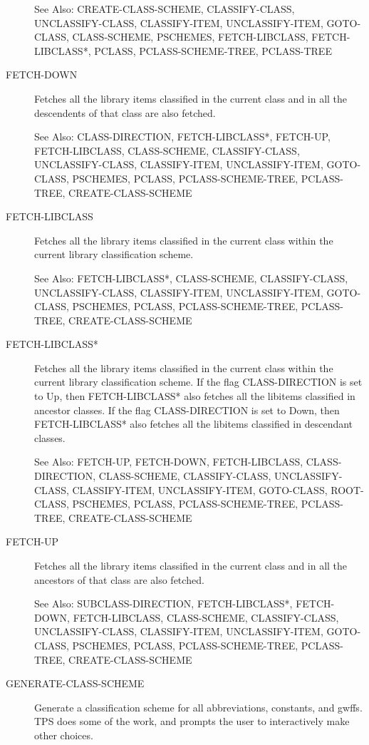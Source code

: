 \begin{description}
See Also: CREATE-CLASS-SCHEME, CLASSIFY-CLASS, UNCLASSIFY-CLASS, 
CLASSIFY-ITEM, UNCLASSIFY-ITEM, GOTO-CLASS, CLASS-SCHEME, PSCHEMES,
FETCH-LIBCLASS, FETCH-LIBCLASS*, PCLASS, PCLASS-SCHEME-TREE, PCLASS-TREE

\item[FETCH-DOWN]  
Fetches all the library items classified in the current class
and in all the descendents of that class are also fetched.

See Also: CLASS-DIRECTION, FETCH-LIBCLASS*, FETCH-UP, FETCH-LIBCLASS,
CLASS-SCHEME, CLASSIFY-CLASS, UNCLASSIFY-CLASS, 
CLASSIFY-ITEM, UNCLASSIFY-ITEM, GOTO-CLASS, PSCHEMES,
PCLASS, PCLASS-SCHEME-TREE, PCLASS-TREE, CREATE-CLASS-SCHEME

\item[FETCH-LIBCLASS]  
Fetches all the library items classified in the current class
within the current library classification scheme.

See Also: FETCH-LIBCLASS*, CLASS-SCHEME, CLASSIFY-CLASS, UNCLASSIFY-CLASS, 
CLASSIFY-ITEM, UNCLASSIFY-ITEM, GOTO-CLASS, PSCHEMES,
PCLASS, PCLASS-SCHEME-TREE, PCLASS-TREE, CREATE-CLASS-SCHEME

\item[FETCH-LIBCLASS*]  
Fetches all the library items classified in the current class
within the current library classification scheme.  If the flag
CLASS-DIRECTION is set to Up, then FETCH-LIBCLASS* also fetches
all the libitems classified in ancestor classes.  If the flag
CLASS-DIRECTION is set to Down, then FETCH-LIBCLASS* also fetches
all the libitems classified in descendant classes.

See Also: FETCH-UP, FETCH-DOWN, FETCH-LIBCLASS, CLASS-DIRECTION,
CLASS-SCHEME, CLASSIFY-CLASS, UNCLASSIFY-CLASS, CLASSIFY-ITEM,
UNCLASSIFY-ITEM, GOTO-CLASS, ROOT-CLASS, PSCHEMES, PCLASS, PCLASS-SCHEME-TREE,
PCLASS-TREE, CREATE-CLASS-SCHEME

\item[FETCH-UP]  
Fetches all the library items classified in the current class
and in all the ancestors of that class are also fetched.

See Also: SUBCLASS-DIRECTION, FETCH-LIBCLASS*, FETCH-DOWN, FETCH-LIBCLASS,
CLASS-SCHEME, CLASSIFY-CLASS, UNCLASSIFY-CLASS, 
CLASSIFY-ITEM, UNCLASSIFY-ITEM, GOTO-CLASS, PSCHEMES,
PCLASS, PCLASS-SCHEME-TREE, PCLASS-TREE, CREATE-CLASS-SCHEME

\item[GENERATE-CLASS-SCHEME]  
Generate a classification scheme for all abbreviations,
constants, and gwffs.  TPS does some of the work, and prompts the
user to interactively make other choices.


\end{description}
